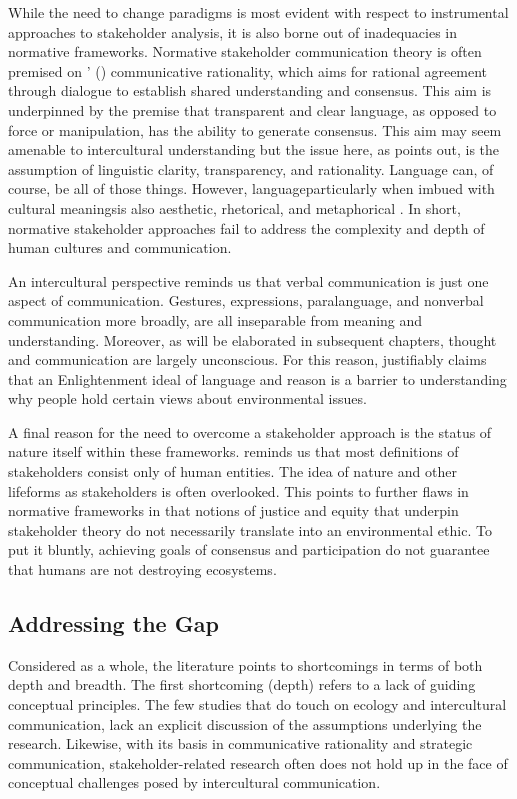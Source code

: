 While the need to change paradigms is most evident with respect to instrumental approaches to stakeholder analysis, it is also borne out of inadequacies in normative frameworks. Normative stakeholder communication theory is often premised on \citeauthor{Habermas1984a}' (\citeyear{Habermas1984a}) communicative rationality, which aims for rational agreement through dialogue to establish shared understanding and consensus. This aim is underpinned by the premise that transparent and clear language, as opposed to force or manipulation, has the ability to generate consensus. This aim may seem amenable to intercultural understanding but the issue here, as \cite{Czobor-Lupp2008} points out, is the assumption of linguistic  clarity, transparency, and rationality. Language can, of course, be all of those things. However, language\textemdash particularly when imbued with cultural meanings\textemdash is also  aesthetic, rhetorical, and metaphorical \citep[430]{Czobor-Lupp2008}. In short, normative stakeholder approaches fail to address the complexity and depth of human cultures and communication. 

An intercultural perspective reminds us that verbal communication is just one aspect of communication. Gestures, expressions, paralanguage, and nonverbal communication more broadly, are all inseparable from meaning and understanding. Moreover, as will be elaborated in subsequent chapters, thought and communication are largely unconscious. For this reason, \cite{Lakoff2010a} justifiably claims that an Enlightenment ideal of language and reason is a barrier to understanding why people hold certain views about environmental issues. 

A final reason for the need to overcome a stakeholder approach is the status of nature itself within these frameworks. \cite*{Starik1995} reminds us that most definitions of stakeholders consist only of human entities. The idea of nature and other lifeforms as stakeholders is often overlooked. This points to further flaws in normative frameworks in that notions of justice and equity that underpin stakeholder theory do not necessarily translate into an environmental ethic. To put it bluntly, achieving goals of consensus and participation do not guarantee that humans are not destroying ecosystems. 

\subsection{Addressing the Gap}

Considered as a whole, the literature points to shortcomings in terms of both depth and breadth. The first shortcoming (depth) refers to a lack of guiding conceptual principles. The few studies that do touch on ecology and intercultural communication, lack an explicit discussion of the assumptions underlying the research. Likewise, with its basis in communicative rationality and strategic communication, stakeholder-related research often does not hold up in the face of conceptual challenges posed by intercultural communication. 

